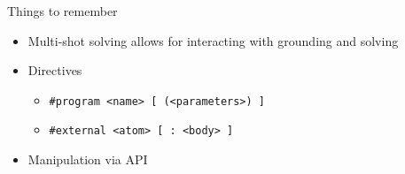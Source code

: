 \begin{frame}{Things to remember}
  \bigskip
  \begin{itemize}
  \item Multi-shot solving allows for interacting with grounding and solving
    \medskip
  \item Directives
    \smallskip
    \begin{itemize}\normalsize
    \item \texttt{\#program <name> [ (<parameters>) ]}
    \item \texttt{\#external <atom> [ : <body> ]}
    \end{itemize}
    \smallskip
  \item Manipulation via API
  \end{itemize}
\end{frame}
%
